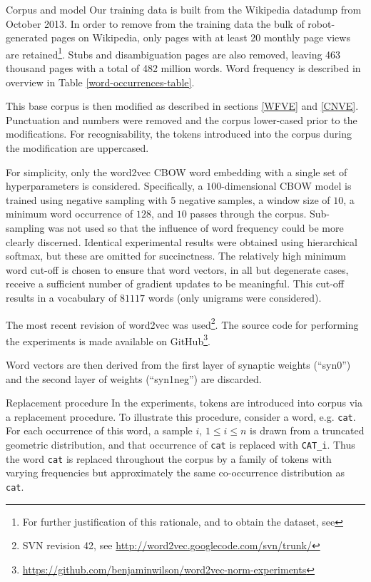 \documentclass{article} %
\newcommand{\word}[1]{\texttt{#1}}
\begin{document}
\begin{section}{Corpus and model}\label{corpus-and-model}
Our training data is built from the Wikipedia datadump from October 2013.
In order to remove from the training data the bulk of robot-generated pages on Wikipedia, only pages with at least 20 monthly page views are retained\footnote{For further justification of this rationale, and to obtain the dataset, see \blogpost}.
Stubs and disambiguation pages are also removed, leaving 463 thousand pages with a total of 482 million words.
Word frequency is described in overview in Table \ref{word-occurrences-table}.

This base corpus is then modified as described in sections \ref{WFVE} and \ref{CNVE}.
Punctuation and numbers were removed and the corpus lower-cased prior to the modifications.
For recognisability, the tokens introduced into the corpus during the modification are uppercased.

For simplicity, only the word2vec CBOW word embedding with a single set of hyperparameters is considered.
Specifically, a $100$-dimensional CBOW model is trained using negative sampling with 5 negative samples, a window size of $10$, a minimum word occurrence of $128$, and $10$ passes through the corpus.
Sub-sampling was not used so that the influence of word frequency could be more clearly discerned.
Identical experimental results were obtained using hierarchical softmax, but these are omitted for succinctness.
The relatively high minimum word cut-off is chosen to ensure that word vectors, in all but degenerate cases, receive a sufficient number of gradient updates to be meaningful.
This cut-off results in a vocabulary of $81117$ words (only unigrams were considered).

The most recent revision of word2vec was used\footnote{SVN revision 42, see \url{http://word2vec.googlecode.com/svn/trunk/}}.
The source code for performing the experiments is made available on GitHub\footnote{\url{https://github.com/benjaminwilson/word2vec-norm-experiments}}.

Word vectors are then derived from the first layer of synaptic weights (``syn0'') and the second layer of weights (``syn1neg'') are discarded.

\begin{table}
	
	\caption{ Number of words, by frequency band, as observed in the unmodified corpus.  }
	\label{word-occurrences-table}
\end{table}

\begin{subsection}{Replacement procedure}\label{replacement-procedure}
In the experiments, tokens are introduced into corpus via a replacement procedure.
To illustrate this procedure, consider a word, e.g. \word{cat}.
For each occurrence of this word, a sample $i$, $1 \leqslant i \leqslant n$ is drawn from a truncated geometric distribution, and that occurrence of \word{cat} is replaced with \word{CAT\_i}.
Thus the word \word{cat} is replaced throughout the corpus by a family of tokens with varying frequencies but approximately the same co-occurrence distribution as \word{cat}.


\end{subsection}
\end{section}
\end{document}

